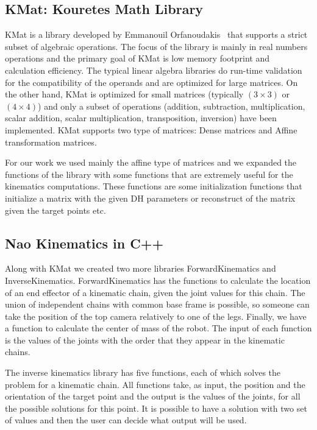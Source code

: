 \subsection{KMat: Kouretes Math Library}
KMat is a library developed by Emmanouil Orfanoudakis~\cite{orfanoudakis2011} that supports a strict subset of algebraic operations. The focus of the library is mainly in real numbers operations and the primary goal of KMat is low memory footprint and calculation efficiency. The typical linear algebra libraries do run-time validation for the compatibility of the operands and are optimized for large matrices. On the other hand, KMat is optimized for small matrices (typically $(3\times3)$ or $(4\times4)$) and only a subset of operations (addition, subtraction, multiplication, scalar addition, scalar multiplication, transposition, inversion) have been implemented. KMat supports two type of matrices: Dense matrices and Affine transformation matrices.

For our work we used mainly the affine type of matrices and we expanded the functions of the library with some functions that are extremely useful for the kinematics computations. These functions are some initialization functions that initialize a matrix with the given DH parameters or reconstruct of the matrix given the target points etc.

\subsection{Nao Kinematics in C++}
Along with KMat we created two more libraries ForwardKinematics and InverseKinematics. ForwardKinematics has the functions to calculate the location of an end effector of a kinematic chain, given the joint values for this chain. The union of independent chains with common base frame is possible, so someone can take the position of the top camera relatively to one of the legs. Finally, we have a function to calculate the center of mass of the robot. The input of each function is the values of the joints with the order that they appear in the kinematic chains.

The inverse kinematics library has five functions, each of which solves the problem for a kinematic chain. All functions take, as input, the position and the orientation of the target point and the output is the values of the joints, for all the possible solutions for this point. It is possible to have a solution with two set of values and then the user can decide what output will be used. 

